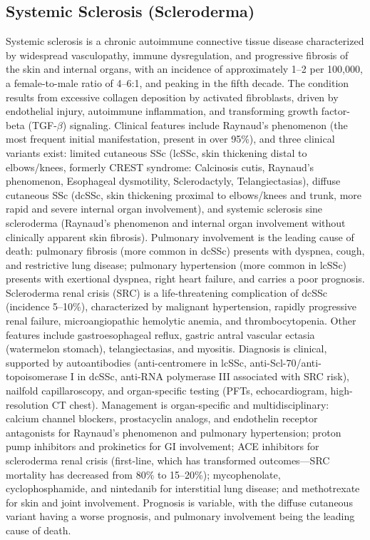 \subsection{Systemic Sclerosis (Scleroderma)}
\label{sec:Systemic Sclerosis (Scleroderma)}
Systemic sclerosis is a chronic autoimmune connective tissue disease characterized by widespread vasculopathy, immune dysregulation, and progressive fibrosis of the skin and internal organs, with an incidence of approximately 1--2 per 100,000, a female-to-male ratio of 4--6:1, and peaking in the fifth decade. The condition results from excessive collagen deposition by activated fibroblasts, driven by endothelial injury, autoimmune inflammation, and transforming growth factor-beta (TGF-$\beta$) signaling. Clinical features include Raynaud's phenomenon (the most frequent initial manifestation, present in over 95\%), and three clinical variants exist: limited cutaneous SSc (lcSSc, skin thickening distal to elbows/knees, formerly CREST syndrome: Calcinosis cutis, Raynaud's phenomenon, Esophageal dysmotility, Sclerodactyly, Telangiectasias), diffuse cutaneous SSc (dcSSc, skin thickening proximal to elbows/knees and trunk, more rapid and severe internal organ involvement), and systemic sclerosis sine scleroderma (Raynaud's phenomenon and internal organ involvement without clinically apparent skin fibrosis). Pulmonary involvement is the leading cause of death: pulmonary fibrosis (more common in dcSSc) presents with dyspnea, cough, and restrictive lung disease; pulmonary hypertension (more common in lcSSc) presents with exertional dyspnea, right heart failure, and carries a poor prognosis. Scleroderma renal crisis (SRC) is a life-threatening complication of dcSSc (incidence 5--10\%), characterized by malignant hypertension, rapidly progressive renal failure, microangiopathic hemolytic anemia, and thrombocytopenia. Other features include gastroesophageal reflux, gastric antral vascular ectasia (watermelon stomach), telangiectasias, and myositis. Diagnosis is clinical, supported by autoantibodies (anti-centromere in lcSSc, anti-Scl-70/anti-topoisomerase I in dcSSc, anti-RNA polymerase III associated with SRC risk), nailfold capillaroscopy, and organ-specific testing (PFTs, echocardiogram, high-resolution CT chest). Management is organ-specific and multidisciplinary: calcium channel blockers, prostacyclin analogs, and endothelin receptor antagonists for Raynaud's phenomenon and pulmonary hypertension; proton pump inhibitors and prokinetics for GI involvement; ACE inhibitors for scleroderma renal crisis (first-line, which has transformed outcomes---SRC mortality has decreased from 80\% to 15--20\%); mycophenolate, cyclophosphamide, and nintedanib for interstitial lung disease; and methotrexate for skin and joint involvement. Prognosis is variable, with the diffuse cutaneous variant having a worse prognosis, and pulmonary involvement being the leading cause of death.

